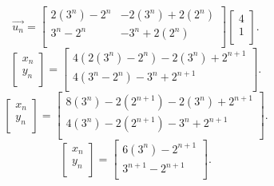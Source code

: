 \documentclass{report}
\begin{document}
 \[
 \vec{ u_n} = \begin{bmatrix}
 2 \left( 3 ^{n} \right) - 2 ^{n} & -2 \left( 3 ^{n} \right) +2 \left( 2 ^{n} \right) \\
 3 ^{n}-2 ^{n} & -3 ^{n} + 2 \left(  2 ^{n} \right) \\
 \end{bmatrix}  \begin{bmatrix}
 4\\
 1\\
 \end{bmatrix}
 .\] 
 \[
 \begin{bmatrix}
 x_n\\
 y_n\\
 \end{bmatrix}
 =  \begin{bmatrix}
 4 \left(  2 \left( 3^{n} \right) - 2 ^{n}  \right) - 2 \left(  3 ^{n} \right)  + 2 ^{n+1}\\
 4 \left( 3 ^{n}- 2 ^{n} \right) - 3 ^{n} + 2 ^{n+1} \\
 \end{bmatrix}
 .\] 
 \[
 \begin{bmatrix}
 x_n\\
 y_n\\
 \end{bmatrix}
 = \begin{bmatrix}
 8 \left( 3 ^{n} \right) -2 \left( 2 ^{n+1} \right) -2 \left( 3^{n} \right) + 2 ^{n+1}\\
 4 \left( 3 ^{n} \right) -2 \left( 2 ^{n+1} \right) -3 ^{n} + 2 ^{n+1}\\
 \end{bmatrix}
 .\] 
 \[
 \begin{bmatrix}
 x_n\\
 y_n\\
 \end{bmatrix}
 = \begin{bmatrix}
 6 \left(  3 ^{n} \right) -2 ^{n+1}\\
  3^{n+1} - 2 ^{n+1}\\
 \end{bmatrix}
 .\] 
\end{document}
